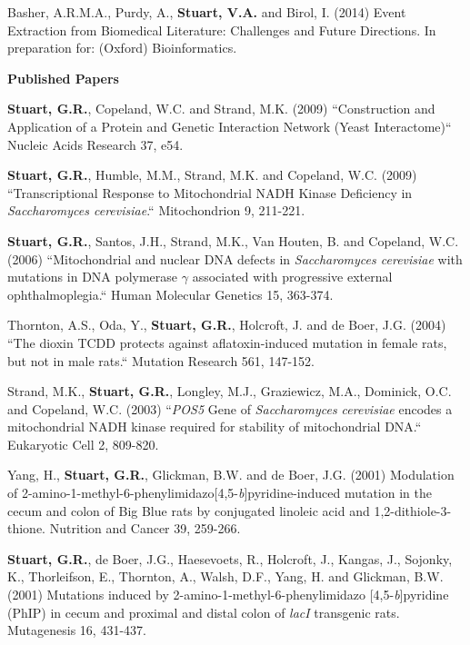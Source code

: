 \documentclass[margin]{res} %
\begin{document}
\begin{resume}
Basher, A.R.M.A., Purdy, A., \textbf{Stuart, V.A.} and Birol, I. (2014) Event Extraction from Biomedical Literature: Challenges and Future Directions. In preparation for: (Oxford) Bioinformatics.

\textbf{Published Papers}

\textbf{Stuart, G.R.}, Copeland, W.C. and Strand, M.K. (2009) ``Construction and Application of a Protein and Genetic Interaction Network (Yeast Interactome)`` Nucleic Acids Research 37, e54.

\textbf{Stuart, G.R.}, Humble, M.M., Strand, M.K. and Copeland, W.C. (2009) ``Transcriptional Response to Mitochondrial NADH Kinase Deficiency in \textit{Saccharomyces cerevisiae}.``  Mitochondrion 9, 211-221.


\textbf{Stuart, G.R.}, Santos, J.H., Strand, M.K., Van Houten, B. and Copeland, W.C. (2006) ``Mitochondrial and nuclear DNA defects in \textit{Saccharomyces cerevisiae} with mutations in DNA polymerase $\gamma$ associated with progressive external ophthalmoplegia.`` Human Molecular Genetics 15, 363-374.

Thornton, A.S., Oda, Y., \textbf{Stuart, G.R.}, Holcroft, J. and de Boer, J.G. (2004) ``The dioxin TCDD protects against aflatoxin-induced mutation in female rats, but not in male rats.`` Mutation Research 561, 147-152.

Strand, M.K., \textbf{Stuart, G.R.}, Longley, M.J., Graziewicz, M.A., Dominick, O.C. and Copeland, W.C. (2003) ``\textit{POS5} Gene of \textit{Saccharomyces cerevisiae} encodes a mitochondrial NADH kinase required for stability of mitochondrial DNA.`` Eukaryotic Cell 2, 809-820.

Yang, H., \textbf{Stuart, G.R.}, Glickman, B.W. and de Boer, J.G. (2001) Modulation of 2-amino-1-methyl-6-phenylimidazo[4,5-\textit{b}]pyridine-induced mutation in the cecum and colon of Big  Blue\textsuperscript{\textregistered} rats by conjugated linoleic acid and 1,2-dithiole-3-thione. Nutrition and Cancer 39, 259-266.

\textbf{Stuart, G.R.}, de Boer, J.G., Haesevoets, R., Holcroft, J., Kangas, J., Sojonky, K., Thorleifson, E., Thornton, A., Walsh, D.F., Yang, H. and Glickman, B.W. (2001) Mutations induced by 2-amino-1-methyl-6-phenylimidazo [4,5-\textit{b}]pyridine (PhIP) in cecum and proximal and distal colon of \textit{lacI} transgenic rats. Mutagenesis 16, 431-437.


\end{resume}
\end{document}
